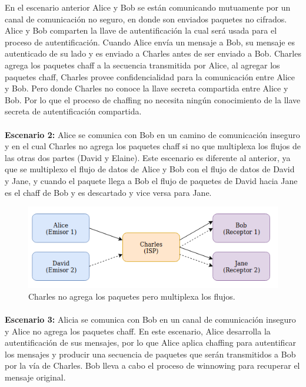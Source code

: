 \documentclass[12pt, a4paper, titlepage]{report}
\begin{document}
		En el escenario anterior Alice y Bob se están comunicando mutuamente por un canal de comunicación no seguro, en donde son enviados paquetes no cifrados. Alice y Bob comparten la llave de autentificación la cual será usada para el proceso de autentificación. Cuando Alice envía un mensaje a Bob, su mensaje es autenticado de su lado y es enviado a Charles antes de ser enviado a Bob. Charles agrega los paquetes chaff a la secuencia transmitida por Alice, al agregar los paquetes chaff, Charles provee confidencialidad para la comunicación entre Alice y Bob. Pero donde Charles no conoce la llave secreta compartida entre Alice y Bob. Por lo que el proceso de chaffing no necesita ningún conocimiento de la llave secreta de autentificación compartida.
		\paragraph{}
		\textbf{Escenario 2:} Alice se comunica con Bob en un camino de comunicación inseguro y en el cual Charles no agrega los paquetes chaff si no que multiplexa los flujos de las otras dos partes (David y Elaine). Este escenario es diferente al anterior, ya que se multiplexo el flujo de datos de Alice y Bob con el flujo de datos de David y Jane, y cuando el paquete llega a Bob el flujo de paquetes de David hacia Jane es el chaff de Bob y es descartado y vice versa para Jane.
		
		\begin{figure}[H]
			\begin{center}	                  \includegraphics[width=14cm]{./imagenes/MarcoTeorico/escenario2.png}
				\caption{Charles no agrega los paquetes pero multiplexa los flujos.}
			\end{center}
		\end{figure}
		
		\paragraph{}
		\textbf{Escenario 3:} Alicia se comunica con Bob en un canal de comunicación inseguro y Alice no agrega los paquetes chaff. En este escenario, Alice desarrolla la autentificación de sus mensajes, por lo que Alice aplica chaffing para autentificar los mensajes y producir una secuencia de paquetes que serán transmitidos a Bob por la vía de Charles. Bob lleva a cabo el proceso de winnowing para recuperar el mensaje original.
		
\end{document}
